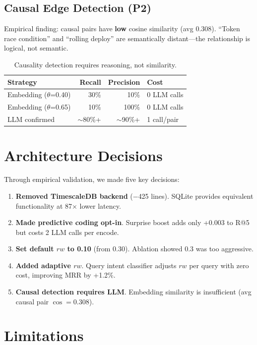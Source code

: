 \documentclass[11pt]{article}
\begin{document}
\subsection{Causal Edge Detection (P2)}

Empirical finding: causal pairs have \textbf{low} cosine similarity (avg 0.308).
``Token race condition'' and ``rolling deploy'' are semantically distant---the
relationship is logical, not semantic.

\begin{table}[h]
\centering
\begin{tabular}{lrrl}
\toprule
Strategy & Recall & Precision & Cost \\
\midrule
Embedding ($\theta$=0.40) & 30\% & 10\% & 0 LLM calls \\
Embedding ($\theta$=0.65) & 10\% & 100\% & 0 LLM calls \\
LLM confirmed & $\sim$80\%+ & $\sim$90\%+ & 1 call/pair \\
\bottomrule
\end{tabular}
\caption{Causality detection requires reasoning, not similarity.}
\label{tab:causal}
\end{table}

\section{Architecture Decisions}

Through empirical validation, we made five key decisions:

\begin{enumerate}
  \item \textbf{Removed TimescaleDB backend} ($-$425 lines). SQLite provides
    equivalent functionality at 87$\times$ lower latency.
  \item \textbf{Made predictive coding opt-in}. Surprise boost adds only
    +0.003 to R@5 but costs 2 LLM calls per encode.
  \item \textbf{Set default $rw$ to 0.10} (from 0.30). Ablation showed 0.3
    was too aggressive.
  \item \textbf{Added adaptive $rw$}. Query intent classifier adjusts $rw$
    per query with zero cost, improving MRR by +1.2\%.
  \item \textbf{Causal detection requires LLM}. Embedding similarity is
    insufficient (avg causal pair $\cos = 0.308$).
\end{enumerate}

\section{Limitations}
\end{document}
